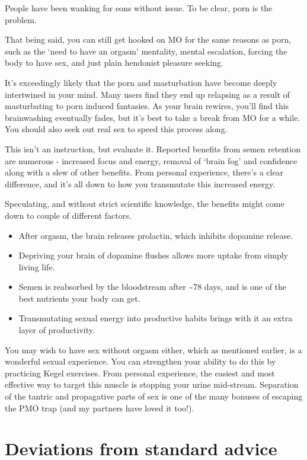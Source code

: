 \documentclass[
]{book}
\begin{document}
People have been wanking for eons without issue. To be clear, porn is the problem.

That being said, you can still get hooked on MO for the same reasons as porn, such as the `need to have an orgasm' mentality, mental escalation, forcing the body to have sex, and just plain hendonist pleasure seeking.

It's exceedingly likely that the porn and masturbation have become deeply intertwined in your mind. Many users find they end up relapsing as a result of masturbating to porn induced fantasies. As your brain rewires, you'll find this brainwashing eventually fades, but it's best to take a break from MO for a while. You should also seek out real sex to speed this process along.

This isn't an instruction, but evaluate it. Reported benefits from semen retention are numerous - increased focus and energy, removal of `brain fog' and confidence along with a slew of other benefits. From personal experience, there's a clear difference, and it's all down to how you transmutate this increased energy.

Speculating, and without strict scientific knowledge, the benefits might come down to couple of different factors.

\begin{itemize}
\item
  After orgasm, the brain releases prolactin, which inhibits dopamine release.
\item
  Depriving your brain of dopamine flushes allows more uptake from simply living life.
\item
  Semen is reabsorbed by the bloodstream after \textasciitilde78 days, and is one of the best nutrients your body can get.
\item
  Transmutating sexual energy into productive habits brings with it an extra layer of productivity.
\end{itemize}

You may wish to have sex without orgasm either, which as mentioned earlier, is a wonderful sexual experience. You can strengthen your ability to do this by practicing Kegel exercises. From personal experience, the easiest and most effective way to target this muscle is stopping your urine mid-stream. Separation of the tantric and propagative parts of sex is one of the many bonuses of escaping the PMO trap (and my partners have loved it too!).

\hypertarget{deviations-from-standard-advice}{%
\section{Deviations from standard advice}\label{deviations-from-standard-advice}}
\end{document}
